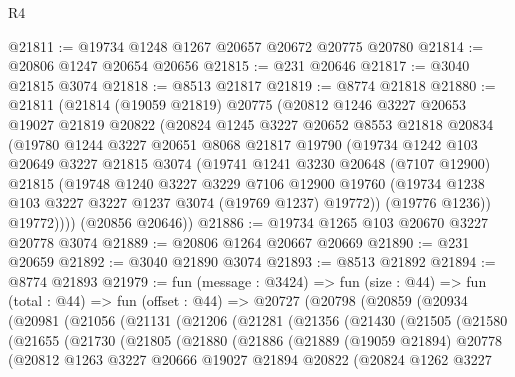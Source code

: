 \begin{lexlean}{R4}
\begin{coremodule}
@21811 := @19734 @1248 @1267 @20657 @20672 @20775 @20780
@21814 := @20806 @1247 @20654 @20656
@21815 := @231 @20646
@21817 := @3040 @21815 @3074
@21818 := @8513 @21817
@21819 := @8774 @21818
@21880 := @21811
    (@21814
      (@19059 @21819)
      @20775
      (@20812
        @1246
        @3227
        @20653
        @19027
        @21819
        @20822
        (@20824
          @1245
          @3227
          @20652
          @8553
          @21818
          @20834
          (@19780
            @1244
            @3227
            @20651
            @8068
            @21817
            @19790
            (@19734
              @1242
              @103
              @20649
              @3227
              @21815
              @3074
              (@19741
                @1241
                @3230
                @20648
                (@7107 @12900)
                @21815
                (@19748
                  @1240
                  @3227
                  @3229
                  @7106
                  @12900
                  @19760
                  (@19734 @1238 @103 @3227 @3227 @1237 @3074 (@19769 @1237) @19772))
                (@19776 @1236))
              @19772))))
      (@20856 @20646))
@21886 := @19734 @1265 @103 @20670 @3227 @20778 @3074
@21889 := @20806 @1264 @20667 @20669
@21890 := @231 @20659
@21892 := @3040 @21890 @3074
@21893 := @8513 @21892
@21894 := @8774 @21893
@21979 := fun (message : @3424) =>
  fun (size : @44) =>
  fun (total : @44) =>
  fun (offset : @44) =>
  @20727
    (@20798
      (@20859
        (@20934
          (@20981
            (@21056
              (@21131
                (@21206
                  (@21281
                    (@21356
                      (@21430
                        (@21505
                          (@21580
                            (@21655
                              (@21730
                                (@21805
                                  (@21880
                                    (@21886
                                      (@21889
                                        (@19059 @21894)
                                        @20778
                                        (@20812
                                          @1263
                                          @3227
                                          @20666
                                          @19027
                                          @21894
                                          @20822
                                          (@20824
                                            @1262
                                            @3227

\end{coremodule}
\end{lexlean}

